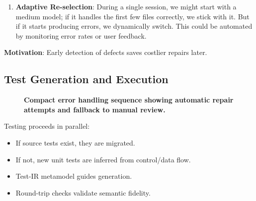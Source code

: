 \documentclass[twocolumn]{article}
\begin{document}
\begin{itemize}
\begin{enumerate}
        \item \textbf{Adaptive Re-selection}: During a single session, we might start with a medium model; if it handles the first few files correctly, we stick with it. But if it starts producing errors, we dynamically switch. This could be automated by monitoring error rates or user feedback.
    \end{enumerate}
\end{itemize}

\textbf{Motivation}: Early detection of defects saves costlier repairs later.

\subsection{Test Generation and Execution}
\begin{figure}[htbp]
    \centering
    \caption{\textbf{Compact error handling sequence showing automatic repair attempts and fallback to manual review.}}
    \label{fig:error_handling_compact}
    \end{figure}
    
    
Testing proceeds in parallel:

\begin{itemize}
    \item If source tests exist, they are migrated.
    \item If not, new unit tests are inferred from control/data flow.
    \item Test-IR metamodel guides generation.
    \item Round-trip checks validate semantic fidelity.
\end{itemize}
\end{document}

